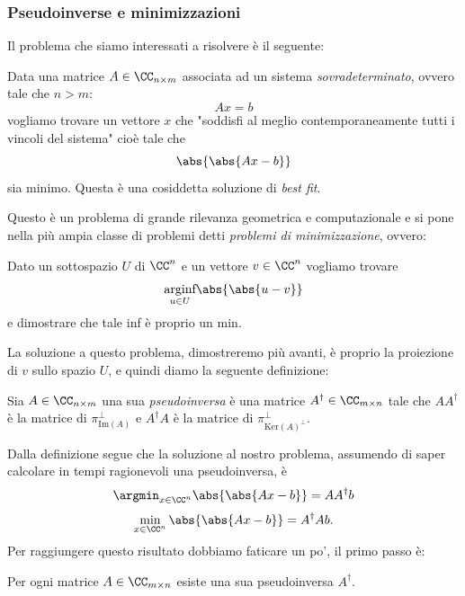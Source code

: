 \documentclass[11pt]{scrartcl}
\newcommand{\Immagine}[1]{\text{Im}\left(#1\right)}
\renewcommand{\ker}[1]{\text{Ker}\left(#1\right)}
\begin{document}
   	 \subsubsection{Pseudoinverse e minimizzazioni}
   	 Il problema che siamo interessati a risolvere è il seguente:
   	 \begin{problem}
   	 	Data una matrice $A\in \CC_{n\times m}$ associata ad un sistema \textit{sovradeterminato}, ovvero tale che $n>m$:
   	 	$$Ax=b$$
   	 	vogliamo trovare un vettore $x$ che "soddisfi al meglio contemporaneamente tutti i vincoli del sistema" cioè tale che 
   	 	$$\abs{\abs{Ax-b}}$$
   	 	sia minimo. Questa è una cosiddetta soluzione di \textit{best fit}.
   	 \end{problem}
   	 Questo è un problema di grande rilevanza geometrica e computazionale e si pone nella più ampia classe di problemi detti \textit{problemi di minimizzazione}, ovvero:
   	 \begin{problem}
   	 	Dato un sottospazio $U$ di $\CC^n$ e un vettore $v\in \CC^n$ vogliamo trovare 
   	 	$$\underset{u\in U}{\text{arginf}}\abs{\abs{u-v}}$$
   	 	e dimostrare che tale inf è proprio un min.
   	 \end{problem}
   	 La soluzione a questo problema, dimostreremo più avanti, è proprio la proiezione di $v$ sullo spazio $U$, e quindi diamo la seguente definizione:
   	 \begin{definition}[Pseudoinversa]
   	 	Sia $A\in \CC_{n\times m}$ una sua \textit{pseudoinversa} è una matrice $A^\dagger\in \CC_{m\times n}$ tale che $AA^\dagger$ è la matrice di $\pi_{\Immagine{A}}^\perp$ e $A^\dagger A$ è la matrice di $\pi_{\ker{A}^\perp}^\perp$.
   	 \end{definition}
   	 Dalla definizione segue che la soluzione al nostro problema, assumendo di saper calcolare in tempi ragionevoli una pseudoinversa, è 
   	 $$\argmin_{x\in \CC^n}\abs{\abs{Ax-b}}=AA^\dagger b $$
   	 $$\min_{x\in \CC^n}\abs{\abs{Ax-b}}=A^\dagger A b.$$
   	 Per raggiungere questo risultato dobbiamo faticare un po', il primo passo è:
   	 \begin{proposition}
   	 	Per ogni matrice $A\in \CC_{m\times n}$ esiste una sua pseudoinversa $A^\dagger$.
   	 \end{proposition}
\end{document}
